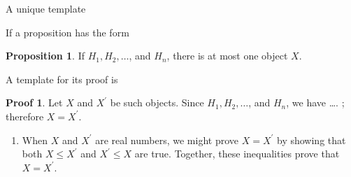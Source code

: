 \documentclass[fleqn]{beamer}
\theoremstyle{definition}
\newtheorem{myth}{Proposition}
\newtheorem{myproof}{Proof}
\begin{document}
\begin{frame}{A unique template}

If a proposition has the form
\begin{myth} If \(H_1, H_2, \dots\), and \( H_n\), there is at most one object \(X\). \end{myth}

A template for its proof is

\begin{myproof} Let \(X\) and \(X^\prime\) be such objects. Since \(H_1, H_2, \dots\), and \( H_n\), we have \dots.  ; therefore \(X = X^\prime\). \end{myproof}



\begin{enumerate}

\item When \(X\) and \(X^\prime \) are real numbers, we might prove \(X = X^\prime\) by showing that both \(X \leq X^\prime\) and  \(X^\prime  \leq X\) are true. Together,
these inequalities prove that  \(X = X^\prime\).
\end{enumerate}

\end{frame}
\end{document}
